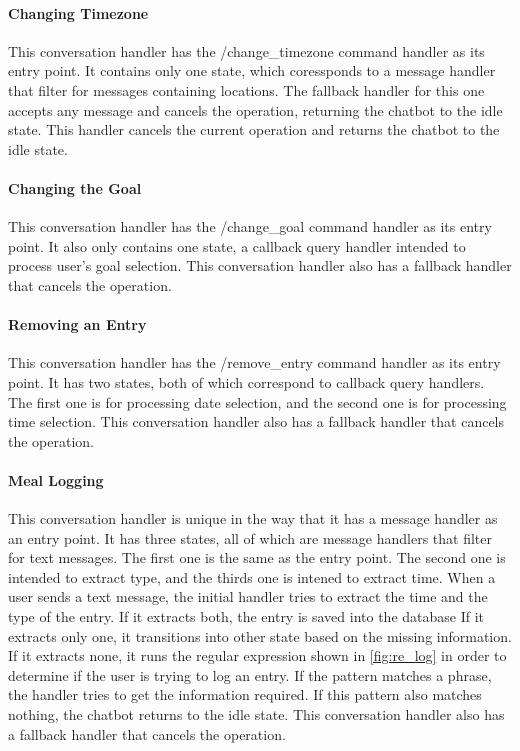 \paragraph{Changing Timezone} This conversation handler has the /change\_timezone command handler as its entry point.
It contains only one state, which coressponds to a message handler that filter for messages containing locations.
The fallback handler for this one accepts any message and cancels the operation, returning the chatbot to the idle state.
This handler cancels the current operation and returns the chatbot to the idle state.

\paragraph{Changing the Goal} This conversation handler has the /change\_goal command handler as its entry point.
It also only contains one state, a callback query handler intended to process user's goal selection.
This conversation handler also has a fallback handler that cancels the operation.

\paragraph{Removing an Entry} This conversation handler has the /remove\_entry command handler as its entry point.
It has two states, both of which correspond to callback query handlers.
The first one is for processing date selection, and the second one is for processing time selection.
This conversation handler also has a fallback handler that cancels the operation.

\paragraph{Meal Logging} This conversation handler is unique in the way that it has a message handler as an entry point.
It has three states, all of which are message handlers that filter for text messages.
The first one is the same as the entry point.
The second one is intended to extract type, and the thirds one is intened to extract time.
When a user sends a text message, the initial handler tries to extract the time and the type of the entry.
If it extracts both, the entry is saved into the database
If it extracts only one, it transitions into other state based on the missing information.
If it extracts none, it runs the regular expression shown in \autoref{fig:re_log} in order to determine if the user is trying to log an entry.
If the pattern matches a phrase, the handler tries to get the information required.
If this pattern also matches nothing, the chatbot returns to the idle state.
This conversation handler also has a fallback handler that cancels the operation.


